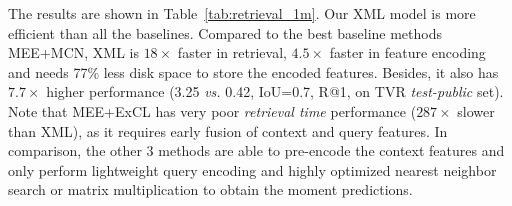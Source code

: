 \documentclass[runningheads]{llncs}
\newcommand{\ra}[1]{\renewcommand{\arraystretch}{#1}}
\begin{document}
\begin{table}[!t]
\setlength{\tabcolsep}{0.3em}
\ra{1.}
\centering
\small
\caption{VCMR on 1M videos with 100 queries. TVR \textit{test-public} set results are included as reference.Model references: \textit{MCN}~\cite{anne2017localizing},
\textit{CAL}~\cite{escorcia2019temporal}, \textit{MEE}~\cite{miech2018learning}, \textit{ExCL}~\cite{ghosh2019excl}}

\label{tab:retrieval_1m}
\end{table}



The results are shown in Table~\ref{tab:retrieval_1m}. Our XML model is more efficient than all the baselines. Compared to the best baseline methods MEE+MCN, XML is $18\times$ faster in retrieval, $4.5\times$ faster in feature encoding and needs 77\% less disk space to store the encoded features. Besides, it also has $7.7\times$ higher performance (3.25 \textit{vs.} 0.42, IoU=0.7, R@1, on TVR \textit{test-public} set). Note that MEE+ExCL has very poor \textit{retrieval time} performance ($287\times$ slower than XML), as it requires early fusion of context and query features. In comparison, the other 3 methods are able to pre-encode the context features and only perform lightweight query encoding and highly optimized nearest neighbor search or matrix multiplication to obtain the moment predictions.
\end{document}
